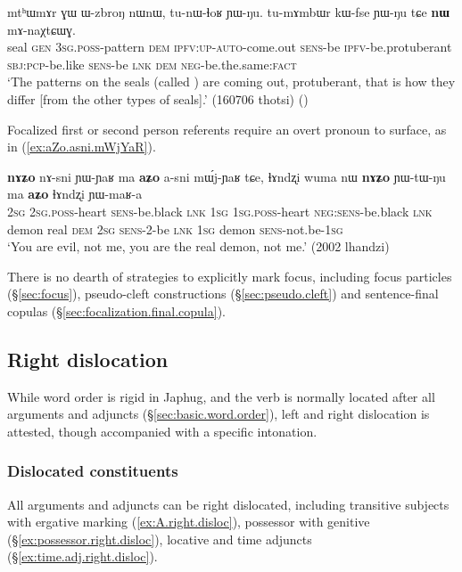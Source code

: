 \begin{exe}
\ex \label{ex:nW.mAnWXtCWG}
\gll mtʰɯmɤr ɣɯ ɯ-zbroŋ nɯnɯ, tu-nɯ-ɬoʁ ɲɯ-ŋu.  tu-mɤmbɯr kɯ-fse ɲɯ-ŋu tɕe \textbf{nɯ} mɤ-naχtɕɯɣ. \\
seal \textsc{gen} \textsc{3sg}.\textsc{poss}-pattern \textsc{dem} \textsc{ipfv}:\textsc{up}-\textsc{auto}-come.out \textsc{sens}-be \textsc{ipfv}-be.protuberant \textsc{sbj}:\textsc{pcp}-be.like \textsc{sens}-be \textsc{lnk} \textsc{dem} \textsc{neg}-be.the.same:\textsc{fact} \\
\glt `The patterns on the seals (called ) are coming out, protuberant, that is how they differ [from the other types of seals].' (160706 thotsi)
()
\end{exe}

Focalized first or second person referents require an overt pronoun to surface, as in (\ref{ex:aZo.asni.mWjYaR}).

\begin{exe}
\ex \label{ex:aZo.asni.mWjYaR}
\gll \textbf{nɤʑo} nɤ-sni ɲɯ-ɲaʁ ma \textbf{aʑo} a-sni mɯ́j-ɲaʁ tɕe, ɬɤndʐi wuma nɯ \textbf{nɤʑo} ɲɯ-tɯ-ŋu ma \textbf{aʑo} ɬɤndʐi ɲɯ-maʁ-a \\
\textsc{2sg} \textsc{2sg}.\textsc{poss}-heart \textsc{sens}-be.black \textsc{lnk} \textsc{1sg} \textsc{1sg}.\textsc{poss}-heart  \textsc{neg}:\textsc{sens}-be.black \textsc{lnk} demon real \textsc{dem} \textsc{2sg} \textsc{sens}-2-be \textsc{lnk} \textsc{1sg} demon \textsc{sens}-not.be-\textsc{1sg} \\
\glt `You are evil, not me, you are the real demon, not me.' (2002 lhandzi)
\end{exe}

There is no dearth of strategies to explicitly mark focus, including focus particles (§\ref{sec:focus}), pseudo-cleft constructions (§\ref{sec:pseudo.cleft}) and sentence-final copulas (§\ref{sec:focalization.final.copula}).

\subsection{Right dislocation} \label{sec:right.dislocation}
While word order is rigid in Japhug, and the verb is normally located after all arguments and adjuncts (§\ref{sec:basic.word.order}), left and right dislocation is attested, though accompanied with a specific intonation.

\subsubsection{Dislocated constituents}
All arguments and adjuncts can be right dislocated, including transitive subjects with ergative marking (\ref{ex:A.right.disloc}), possessor with genitive (§\ref{ex:possessor.right.disloc}), locative and time adjuncts (§\ref{ex:time.adj.right.disloc}).

